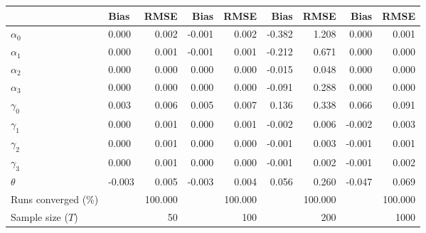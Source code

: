 
\begin{tabular}[t]{llrrrrrrr}
\toprule
  & Bias & RMSE & Bias & RMSE & Bias & RMSE & Bias & RMSE\\
\midrule
$\alpha_{0}$ & 0.000 & 0.002 & -0.001 & 0.002 & -0.382 & 1.208 & 0.000 & 0.001\\
$\alpha_{1}$ & 0.000 & 0.001 & -0.001 & 0.001 & -0.212 & 0.671 & 0.000 & 0.000\\
$\alpha_{2}$ & 0.000 & 0.000 & 0.000 & 0.000 & -0.015 & 0.048 & 0.000 & 0.000\\
$\alpha_{3}$ & 0.000 & 0.000 & 0.000 & 0.000 & -0.091 & 0.288 & 0.000 & 0.000\\
$\gamma_{0}$ & 0.003 & 0.006 & 0.005 & 0.007 & 0.136 & 0.338 & 0.066 & 0.091\\
$\gamma_{1}$ & 0.000 & 0.001 & 0.000 & 0.001 & -0.002 & 0.006 & -0.002 & 0.003\\
$\gamma_{2}$ & 0.000 & 0.001 & 0.000 & 0.000 & -0.001 & 0.003 & -0.001 & 0.001\\
$\gamma_{3}$ & 0.000 & 0.001 & 0.000 & 0.000 & -0.001 & 0.002 & -0.001 & 0.002\\
$\theta$ & -0.003 & 0.005 & -0.003 & 0.004 & 0.056 & 0.260 & -0.047 & 0.069\\
Runs converged (\%) &  & 100.000 &  & 100.000 &  & 100.000 &  & 100.000\\
Sample size ($T$) &  & 50 &  & 100 &  & 200 &  & 1000\\
\bottomrule
\end{tabular}
